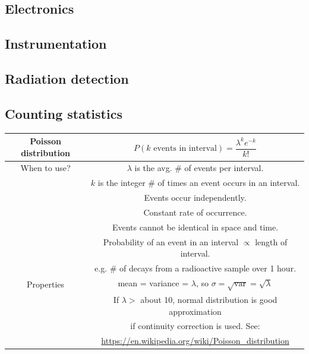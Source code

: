 \subsection{Electronics} 


\subsection{Instrumentation} 


\subsection{Radiation detection} 


\subsection{Counting statistics} 
\center
\begin{tabular}{|c|c|}
\hline

Poisson distribution &  $P(k \textrm{ events in interval}) = \dfrac{\lambda^ke^{-k}}{k!}$ \\
\hline
When to use? & $\lambda$ is the avg. \# of events per interval. \\
& $k$ is the integer \# of times an event occurs in an interval. \\
& Events occur independently. \\
& Constant rate of occurrence. \\
& Events cannot be identical in space and time. \\
& Probability of an event in an interval $\propto$ length of interval. \\
& e.g. \# of decays from a radioactive sample over 1 hour. \\
\hline
Properties & mean = variance = $\lambda$, so $\sigma = \sqrt{\textrm{var}} = \sqrt{\lambda}$ \\
& If $\lambda > $ about 10, normal distribution is good approximation \\
& if continuity correction is used. See:\\
& \url{https://en.wikipedia.org/wiki/Poisson_distribution}

 \\ \hline
\end{tabular}
\flushleft

